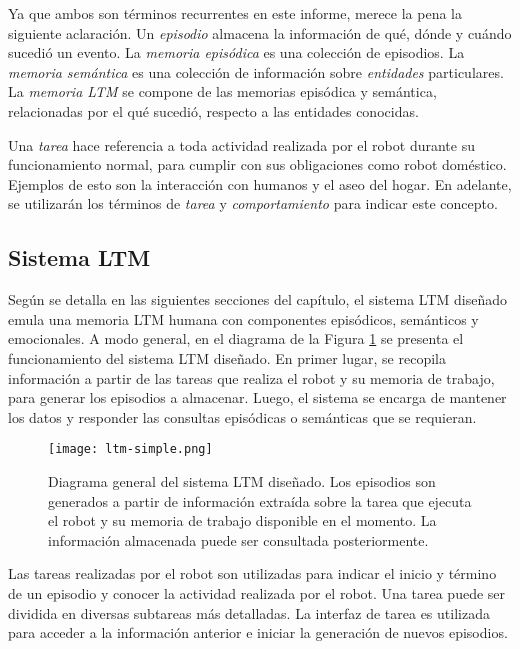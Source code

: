  Ya que ambos son términos recurrentes en este informe, merece la pena la siguiente aclaración. Un \textit{episodio} almacena la información de qué, dónde y cuándo sucedió un evento. La \textit{memoria episódica} es una colección de episodios. La \textit{memoria semántica} es una colección de información sobre \textit{entidades} particulares. La \textit{memoria LTM} se compone de las memorias episódica y semántica, relacionadas por el qué sucedió, respecto a las entidades conocidas.

 Una \textit{tarea} hace referencia a toda actividad realizada por el robot durante su funcionamiento normal, para cumplir con sus obligaciones como robot doméstico. Ejemplos de esto son la interacción con humanos y el aseo del hogar. En adelante, se utilizarán los términos de \textit{tarea} y \textit{comportamiento} para indicar este concepto.

\subsection{Sistema LTM} 

Según se detalla en las siguientes secciones del capítulo, el sistema LTM diseñado emula una memoria LTM humana con componentes episódicos, semánticos y emocionales. A modo general, en el diagrama de la Figura \ref{img:diagrama-ltm-simple} se presenta el funcionamiento del sistema LTM diseñado. En primer lugar, se recopila información a partir de las tareas que realiza el robot y su memoria de trabajo, para generar los episodios a almacenar. Luego, el sistema se encarga de mantener los datos y responder las consultas episódicas o semánticas que se requieran.

\begin{figure}[!ht]
	\centering
	\texttt{[image: ltm-simple.png]}
	\caption[Diagrama funcional del sistema LTM diseñado.]
	{\small Diagrama general del sistema LTM diseñado. Los episodios son generados a partir de información extraída sobre la tarea que ejecuta el robot y su memoria de trabajo disponible en el momento. La información almacenada puede ser consultada posteriormente.}
	\label{img:diagrama-ltm-simple}
\end{figure}

 Las tareas realizadas por el robot son utilizadas para indicar el inicio y término de un episodio y conocer la actividad realizada por el robot. Una tarea puede ser dividida en diversas subtareas más detalladas. La interfaz de tarea es utilizada para acceder a la información anterior e iniciar la generación de nuevos episodios.

